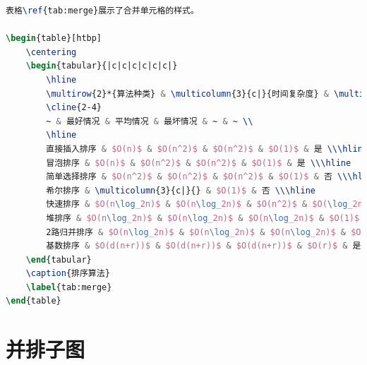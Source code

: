 \begin{lstlisting}[language=tex]
表格\ref{tab:merge}展示了合并单元格的样式。

\begin{table}[htbp]
	\centering
	\begin{tabular}{|c|c|c|c|c|c|}
		\hline
		\multirow{2}*{算法种类} & \multicolumn{3}{c|}{时间复杂度} & \multirow{2}*{空间复杂度} & \multirow{2}*{是否稳定} \\
		\cline{2-4}
		~ & 最好情况 & 平均情况 & 最坏情况 & ~ & ~ \\
		\hline
		直接插入排序 & $O(n)$ & $O(n^2)$ & $O(n^2)$ & $O(1)$ & 是 \\\hline
		冒泡排序 & $O(n)$ & $O(n^2)$ & $O(n^2)$ & $O(1)$ & 是 \\\hline
		简单选择排序 & $O(n^2)$ & $O(n^2)$ & $O(n^2)$ & $O(1)$ & 否 \\\hline
		希尔排序 & \multicolumn{3}{c|}{} & $O(1)$ & 否 \\\hline
		快速排序 & $O(n\log_2n)$ & $O(n\log_2n)$ & $O(n^2)$ & $O(\log_2n)$ & 否 \\\hline
		堆排序 & $O(n\log_2n)$ & $O(n\log_2n)$ & $O(n\log_2n)$ & $O(1)$ & 否 \\\hline
		2路归并排序 & $O(n\log_2n)$ & $O(n\log_2n)$ & $O(n\log_2n)$ & $O(n)$ & 是 \\\hline
		基数排序 & $O(d(n+r))$ & $O(d(n+r))$ & $O(d(n+r))$ & $O(r)$ & 是 \\\hline
	\end{tabular}
	\caption{排序算法}
	\label{tab:merge}
\end{table}
\end{lstlisting}

\section{并排子图}

